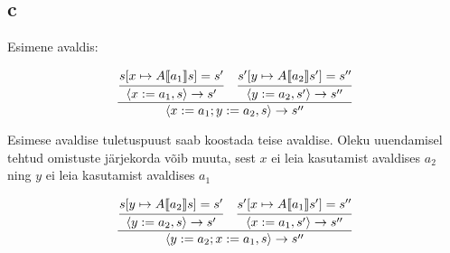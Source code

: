 \subsection{c}

Esimene avaldis:

\[
  \frac{
    \cfrac{
      s[x \mapsto A \llbracket a_1 \rrbracket s] = s'
    }
    {
      \langle x := a_1, s \rangle \rightarrow s'
    }
    \quad
    \cfrac{
      s'[y \mapsto A \llbracket a_2 \rrbracket s'] = s''
    }
    {
      \langle y := a_2, s' \rangle \rightarrow s''
    }
  }{
    \langle x := a_1; y := a_2, s \rangle \rightarrow s''
  }
\]

Esimese avaldise tuletuspuust saab koostada teise avaldise. Oleku uuendamisel
tehtud omistuste järjekorda võib muuta, sest \(x\) ei leia kasutamist avaldises \(a_2\)
ning \(y\) ei leia kasutamist avaldises \(a_1\)

\[
  \frac{
    \cfrac{
      s[y \mapsto A \llbracket a_2 \rrbracket s] = s'
    }
    {
      \langle y := a_2, s \rangle \rightarrow s'
    }
    \quad
    \cfrac{
      s'[x \mapsto A \llbracket a_1 \rrbracket s'] = s''
    }
    {
      \langle x := a_1, s' \rangle \rightarrow s''
    }
  }{
    \langle y := a_2; x := a_1, s \rangle \rightarrow s''
  }
\]
